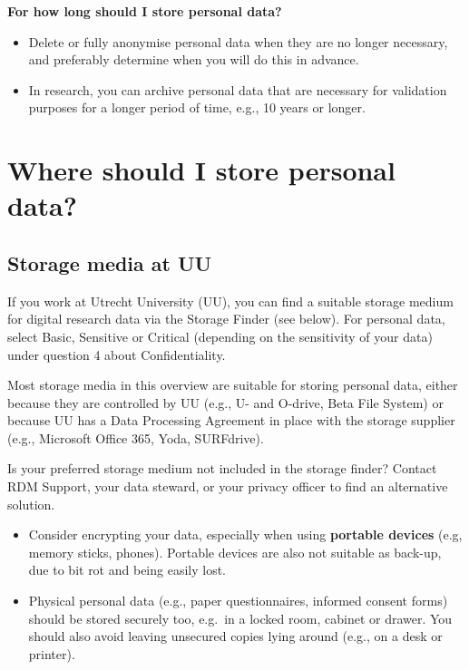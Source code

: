 \documentclass[
]{book}
\providecommand{\tightlist}{%
  \setlength{\itemsep}{0pt}\setlength{\parskip}{0pt}}
\begin{document}
\textbf{For how long should I store personal data?}

\begin{itemize}
\tightlist
\item
  Delete or fully anonymise personal data when they are no longer necessary,
  and preferably determine when you will do this in advance.
\item
  In research, you can archive personal data that are necessary for validation
  purposes for a longer period of time, e.g., 10 years or longer.
\end{itemize}

\hypertarget{data-storage-where}{%
\section{Where should I store personal data?}\label{data-storage-where}}

\hypertarget{storage-media-at-uu}{%
\subsection{Storage media at UU}\label{storage-media-at-uu}}

If you work at Utrecht University (UU), you can find a suitable storage medium for
digital research data via the Storage Finder (see below). For personal data, select Basic,
Sensitive or Critical (depending on the sensitivity of your data) under question
4 about Confidentiality.

Most storage media in this overview are suitable for storing personal data, either
because they are controlled by UU (e.g., U- and O-drive, Beta File System) or
because UU has a Data Processing Agreement in place with the storage supplier
(e.g., Microsoft Office 365, Yoda, SURFdrive).

Is your preferred storage medium not included in the storage finder? Contact
RDM Support, your data steward, or your
privacy officer to find an alternative solution.

\begin{itemize}
\tightlist
\item
  Consider encrypting your data, especially when using \textbf{portable devices}
  (e.g, memory sticks, phones). Portable devices are also not suitable as back-up,
  due to bit rot and being easily lost.
\item
  Physical personal data (e.g., paper questionnaires, informed consent forms)
  should be stored securely too, e.g.~in a locked room, cabinet or drawer. You
  should also avoid leaving unsecured copies lying around (e.g., on a desk or printer).
\end{itemize}
\end{document}

